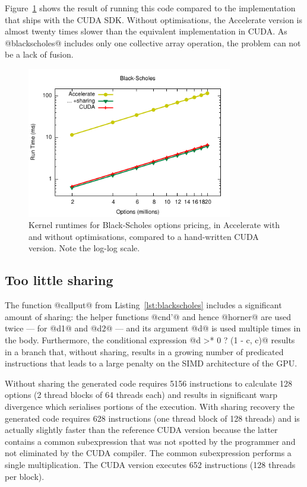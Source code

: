 Figure~\ref{fig:blackscholes} shows the result of running this code compared to
the implementation that ships with the CUDA SDK. Without optimisations, the
Accelerate version is almost twenty times slower than the equivalent
implementation in CUDA\@. As @blackscholes@ includes only one collective array
operation, the problem can not be a lack of fusion.

\begin{figure}
    \begin{center}
        \includegraphics[width=0.8\textwidth]{images/sec-6/black-scholes/black-scholes}
    \end{center}
    \caption[Black-Scholes kernel benchmarks]{Kernel runtimes for Black-Scholes
        options pricing, in Accelerate with and without optimisations, compared
        to a hand-written CUDA version. Note the log-log scale.}
    \label{fig:blackscholes}
\end{figure}

\subsection{Too little sharing}

The function @callput@ from Listing~\ref{lst:blackscholes} includes a
significant amount of sharing: the helper functions @cnd'@ and hence
@horner@ are used twice --- for @d1@ and @d2@ --- and its
argument @d@ is used multiple times in the body. Furthermore, the
conditional expression @d >* 0 ? (1 - c, c)@ results in a branch that,
without sharing, results in a growing number of predicated instructions that
leads to a large penalty on the SIMD architecture of the GPU\@.

Without sharing the generated code requires 5156 instructions to calculate 128
options (2 thread blocks of 64 threads each) and results in significant warp
divergence which serialises portions of the execution. With sharing recovery the
generated code requires 628 instructions (one thread block of 128 threads) and
is actually slightly faster than the reference CUDA version because the latter
contains a common subexpression that was not spotted by the programmer and not
eliminated by the CUDA compiler. The common subexpression performs a single
multiplication. The CUDA version executes 652 instructions (128 threads per
block).


